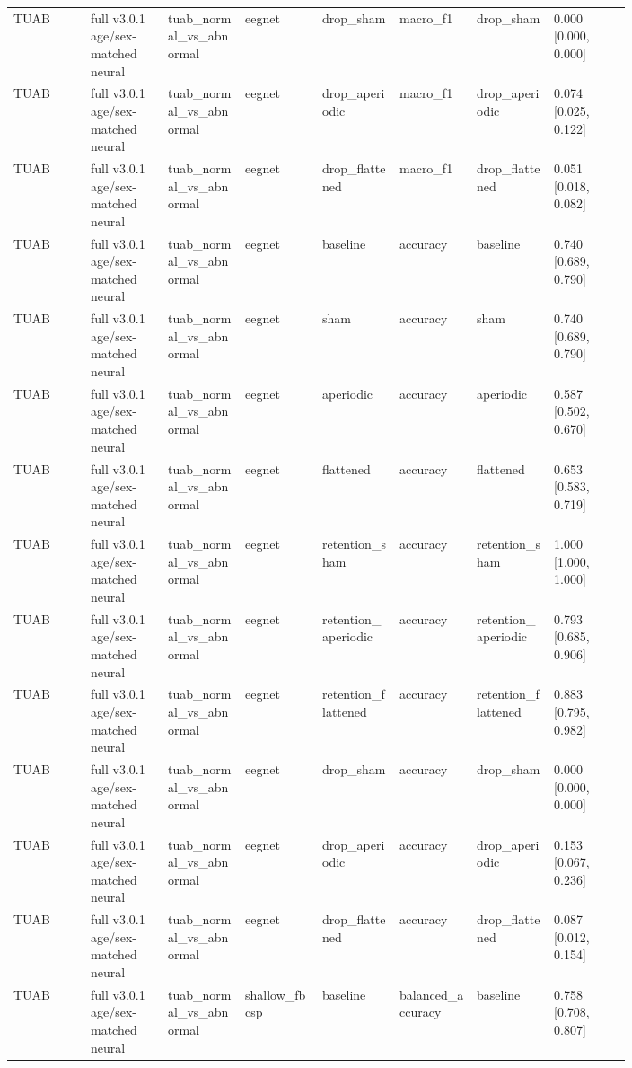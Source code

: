 \begin{longtable}{p{0.10\linewidth}p{0.10\linewidth}p{0.10\linewidth}p{0.10\linewidth}p{0.10\linewidth}p{0.10\linewidth}p{0.10\linewidth}p{0.10\linewidth}}
TUAB & full v3.0.1 age/sex-matched neural & tuab\_normal\_vs\_abnormal & eegnet & drop\_sham & macro\_f1 & drop\_sham & 0.000 [0.000, 0.000]\\
TUAB & full v3.0.1 age/sex-matched neural & tuab\_normal\_vs\_abnormal & eegnet & drop\_aperiodic & macro\_f1 & drop\_aperiodic & 0.074 [0.025, 0.122]\\
TUAB & full v3.0.1 age/sex-matched neural & tuab\_normal\_vs\_abnormal & eegnet & drop\_flattened & macro\_f1 & drop\_flattened & 0.051 [0.018, 0.082]\\
TUAB & full v3.0.1 age/sex-matched neural & tuab\_normal\_vs\_abnormal & eegnet & baseline & accuracy & baseline & 0.740 [0.689, 0.790]\\
TUAB & full v3.0.1 age/sex-matched neural & tuab\_normal\_vs\_abnormal & eegnet & sham & accuracy & sham & 0.740 [0.689, 0.790]\\
TUAB & full v3.0.1 age/sex-matched neural & tuab\_normal\_vs\_abnormal & eegnet & aperiodic & accuracy & aperiodic & 0.587 [0.502, 0.670]\\
TUAB & full v3.0.1 age/sex-matched neural & tuab\_normal\_vs\_abnormal & eegnet & flattened & accuracy & flattened & 0.653 [0.583, 0.719]\\
TUAB & full v3.0.1 age/sex-matched neural & tuab\_normal\_vs\_abnormal & eegnet & retention\_sham & accuracy & retention\_sham & 1.000 [1.000, 1.000]\\
TUAB & full v3.0.1 age/sex-matched neural & tuab\_normal\_vs\_abnormal & eegnet & retention\_aperiodic & accuracy & retention\_aperiodic & 0.793 [0.685, 0.906]\\
TUAB & full v3.0.1 age/sex-matched neural & tuab\_normal\_vs\_abnormal & eegnet & retention\_flattened & accuracy & retention\_flattened & 0.883 [0.795, 0.982]\\
TUAB & full v3.0.1 age/sex-matched neural & tuab\_normal\_vs\_abnormal & eegnet & drop\_sham & accuracy & drop\_sham & 0.000 [0.000, 0.000]\\
TUAB & full v3.0.1 age/sex-matched neural & tuab\_normal\_vs\_abnormal & eegnet & drop\_aperiodic & accuracy & drop\_aperiodic & 0.153 [0.067, 0.236]\\
TUAB & full v3.0.1 age/sex-matched neural & tuab\_normal\_vs\_abnormal & eegnet & drop\_flattened & accuracy & drop\_flattened & 0.087 [0.012, 0.154]\\
TUAB & full v3.0.1 age/sex-matched neural & tuab\_normal\_vs\_abnormal & shallow\_fbcsp & baseline & balanced\_accuracy & baseline & 0.758 [0.708, 0.807]\\

\end{longtable}
